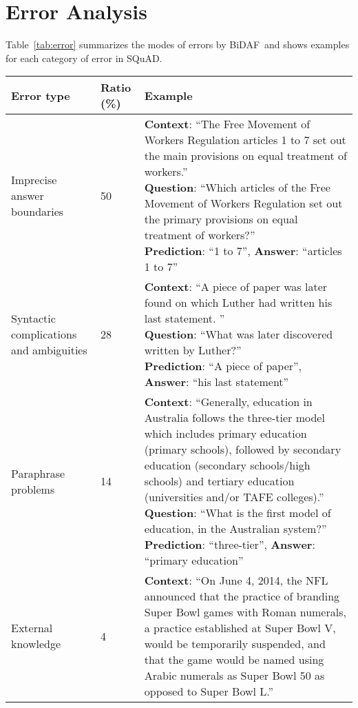 \documentclass{article} \usepackage{iclr2017_conference,times}
\newcommand{\sysshort}{\mbox{\sc BiDAF}}
\begin{document}
\section{Error Analysis}\label{sec:error}
Table~\ref{tab:error} summarizes the modes of errors by \sysshort\  and shows examples for each category of error in SQuAD. 
\begin{table}[!htb]
    \centering
    \begin{tabular}{L{2cm} C{1.5cm} L{9.5cm}}
        Error type & Ratio (\%) & Example\\
        \hline
        \hline
        Imprecise answer boundaries & 50 & \parbox[t]{9cm}{\textbf{Context}: ``The Free Movement of Workers Regulation articles 1 to 7 set out the main provisions on equal treatment of workers.''\\
        \textbf{Question}: ``Which articles of the Free Movement of Workers Regulation set out the primary provisions on equal treatment of workers?''\\
        \textbf{Prediction}: ``1 to 7'',
        \textbf{Answer}: ``articles 1 to 7'' \\}\\
        \hline
        Syntactic complications and ambiguities & 28 & \parbox[t]{9cm}{\textbf{Context}: ``A piece of paper was later found on which Luther had written his last statement. ''\\
        \textbf{Question}: ``What was later discovered written by Luther?''\\
        \textbf{Prediction}: ``A piece of paper'',
        \textbf{Answer}: ``his last statement'' \\}\\
        \hline
        Paraphrase problems & 14 & \parbox[t]{9cm}{\textbf{Context}: ``Generally, education in Australia follows the three-tier model which includes primary education (primary schools), followed by secondary education (secondary schools/high schools) and tertiary education (universities and/or TAFE colleges).''\\
        \textbf{Question}: ``What is the first model of education, in the Australian system?''\\
        \textbf{Prediction}: ``three-tier'',
        \textbf{Answer}: ``primary education'' \\}\\
        \hline
        External knowledge & 4 & \parbox[t]{9cm}{\textbf{Context}: ``On June 4, 2014, the NFL announced that the practice of branding Super Bowl games with Roman numerals, a practice established at Super Bowl V, would be temporarily suspended, and that the game would be named using Arabic numerals as Super Bowl 50 as opposed to Super Bowl L.''\\
}
\end{tabular}
\end{table}
\end{document}
